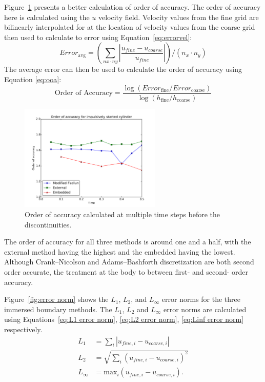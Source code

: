 Figure~\ref{fig:cyerror2} presents a better calculation of order of accuracy. 
The order of accuracy here is calculated using the $u$ velocity field. 
Velocity values from the fine grid are bilinearly interpolated for at the location of velocity values from the coarse grid then used to calculate to error using Equation~\eqref{eq:errorvel}:
\begin{equation}
Error_{\text{avg}}=\left(\sum_{nx\cdot ny}^{} \left|\frac{u_{fine}-u_{coarse}}{u_{fine}}\right|\right)/(n_x\cdot n_y)
\label{eq:errorvel}
\end{equation}
The average error can then be used to calculate the order of accuracy using Equation \eqref{eq:ooa}: 
\begin{equation}
\text{Order of Accuracy} = \frac{\log \left(Error_{\text{fine}}/Error_{\text{coarse}}\right)}{\log \left(h_{\text{fine}}/h_{\text{coarse}}\right)}\label{eq:ooa}
\end{equation}

\begin{figure}[H]
	\centering
	\includegraphics[width=0.6\textwidth]{error_order_2_plt}
	\caption{Order of accuracy calculated at multiple time steps before the discontinuities.}
	\label{fig:cyerror2}
\end{figure}

The order of accuracy for all three methods is around one and a half, with the external method having the highest and the embedded having the lowest. 
Although Crank--Nicolson and Adams--Bashforth discretization are both second order accurate, the treatment at the body to between first- and second- order accuracy. 

Figure~\ref{fig:error norm} shows the $L_1$, $L_2$, and $L_\infty$ error norms for the three immersed boundary methods.
The $L_1$, $L_2$ and $L_\infty$ error norms are calculated using Equations~\eqref{eq:L1 error norm}, \eqref{eq:L2 error norm}, \eqref{eq:Linf error norm} respectively.
\begin{align}
	L_1 &= \sum_{i} \left|u_{fine, i}-u_{coarse,i}\right| \label{eq:L1 error norm} \\
	L_2 &= \sqrt{\sum_{i} \left(u_{fine, i}-u_{coarse,i}\right)^2} \label{eq:L2 error norm} \\
	L_{\infty} &= \text{max}_i\left(u_{fine, i}-u_{coarse,i}\right) .\ \label{eq:Linf error norm}
\end{align}

